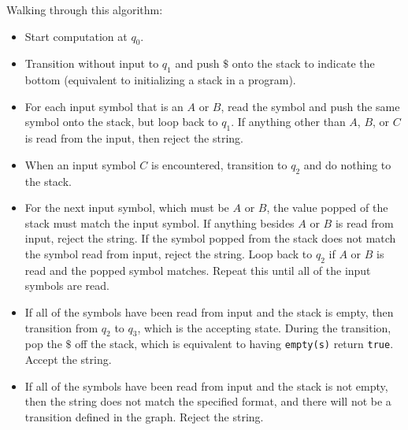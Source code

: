 \documentclass[12pt,letterpaper,final]{report}
\begin{document}
\begin{center}
\end{center}

Walking through this algorithm:
\begin{itemize}
  \item Start computation at $q_0$.
  \item Transition without input to $q_1$ and push $\$$ onto the stack to indicate the bottom (equivalent to initializing a stack in a program).
  \item For each input symbol that is an $A$ or $B$, read the symbol and push the same symbol onto the stack, but loop back to $q_1$. If anything other than $A$, $B$, or $C$ is read from the input, then reject the string.
  \item When an input symbol $C$ is encountered, transition to $q_2$ and do nothing to the stack.
  \item For the next input symbol, which must be $A$ or $B$, the value popped of the stack must match the input symbol. If anything besides $A$ or $B$ is read from input, reject the string. If the symbol popped from the stack does not match the symbol read from input, reject the string. Loop back to $q_2$ if $A$ or $B$ is read and the popped symbol matches. Repeat this until all of the input symbols are read.
  \item If all of the symbols have been read from input and the stack is empty, then transition from $q_2$ to $q_3$, which is the accepting state. During the transition, pop the $\$$ off the stack, which is equivalent to having \verb|empty(s)| return \verb|true|. Accept the string.
  \item If all of the symbols have been read from input and the stack is not empty, then the string does not match the specified format, and there will not be a transition defined in the graph. Reject the string.
\end{itemize}
\end{document}
